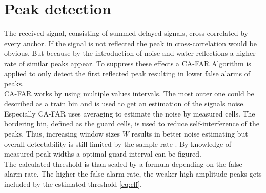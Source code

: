 \section{Peak detection}

The received signal, consisting of summed delayed signals, cross-correlated by every anchor. If the signal is not reflected the peak in cross-correlation would be obvious. But because by the introduction of noise and water reflections a higher rate of similar peaks appear. To suppress these effects a CA-FAR Algorithm \cite{rohling11} is applied to only detect the first reflected peak resulting in lower false alarms of peaks. \\
CA-FAR works by using multiple values intervals. The most outer one could be described as a train bin and is used to get an estimation of the signals noise. Especially CA-FAR uses averaging to estimate the noise by measured cells. The bordering bin, defined as the guard cells, is used to reduce self-interference of the peaks. Thus, increasing window sizes $W$ results in better noise estimating but overall detectability is still limited by the sample rate  \cite{rohling11}\cite{radarbasics}. By knowledge of measured peak widths a optimal guard interval can be figured.\\
The calculated threshold is than scaled by a formula depending on the false alarm rate. The higher the false alarm rate, the weaker high amplitude peaks gets included by the estimated threshold \ref{eq:cff}.\\
%
